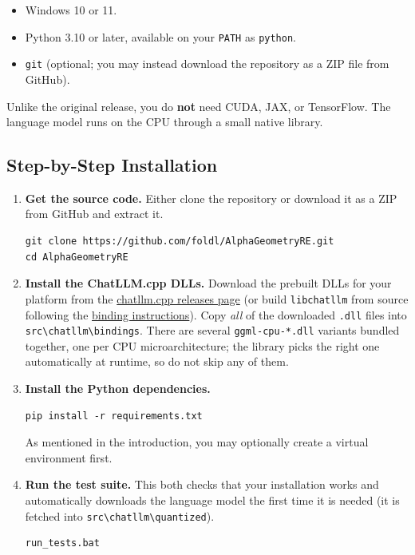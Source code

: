 \documentclass[reqno]{amsart}
\DeclareMathOperator{\1}{\textbf{1}}
\begin{document}
\begin{itemize}
    \item Windows 10 or 11.
    \item Python 3.10 or later, available on your \verb|PATH| as \verb|python|.
    \item \verb|git| (optional; you may instead download the repository as a
          ZIP file from GitHub).
\end{itemize}

Unlike the original release, you do \textbf{not} need CUDA, JAX, or
TensorFlow. The language model runs on the CPU through a small native library.

\subsection{Step-by-Step Installation}

\begin{enumerate}
    \item \textbf{Get the source code.} Either clone the repository or download
          it as a ZIP from GitHub and extract it.
          \begin{lstlisting}
git clone https://github.com/foldl/AlphaGeometryRE.git
cd AlphaGeometryRE
          \end{lstlisting}

    \item \textbf{Install the ChatLLM.cpp DLLs.} Download the prebuilt DLLs for
          your platform from the
          \href{https://github.com/foldl/chatllm.cpp/releases}{chatllm.cpp
          releases page} (or build \verb|libchatllm| from source following the
          \href{https://github.com/foldl/chatllm.cpp/blob/master/docs/binding.md}{binding
          instructions}). Copy \emph{all} of the downloaded \verb|.dll| files
          into \verb|src\chatllm\bindings|. There are several
          \verb|ggml-cpu-*.dll| variants bundled together, one per CPU
          microarchitecture; the library picks the right one automatically at
          runtime, so do not skip any of them.

    \item \textbf{Install the Python dependencies.}
          \begin{lstlisting}
pip install -r requirements.txt
          \end{lstlisting}
          As mentioned in the introduction, you may optionally create a
          virtual environment first.

    \item \textbf{Run the test suite.} This both checks that your installation
          works and automatically downloads the language model the first time
          it is needed (it is fetched into \verb|src\chatllm\quantized|).
          \begin{lstlisting}
run_tests.bat
          \end{lstlisting}
\end{enumerate}
\end{document}
